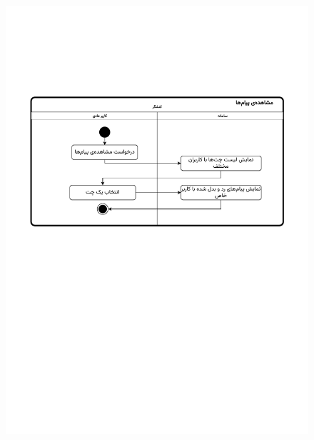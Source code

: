 \begin{figure}[ht!]
	\centering
	\includegraphics[scale=0.8, page=2]{figs/OOD-activity-chat.pdf}
\end{figure}
\FloatBarrier
\newpage

